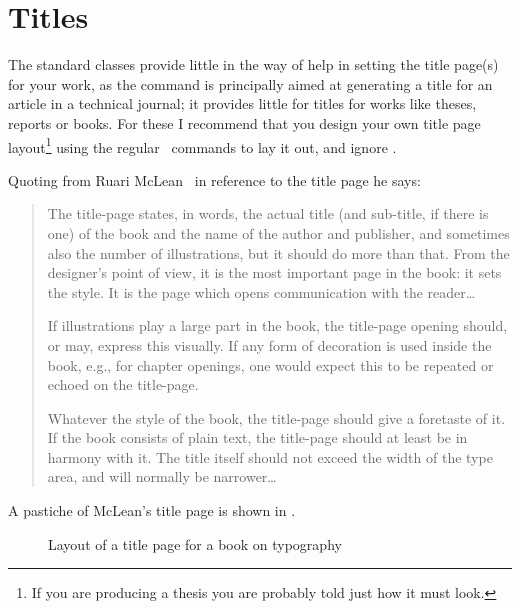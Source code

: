 \chapter{Titles}

   The standard classes provide little in the way of help in setting
the title page(s) for your work, as the \cmd{\maketitle} command
is principally aimed at generating a title for an article in a technical
journal; it provides little for titles for works like theses, reports or
books. For these I recommend that you design your own title page 
layout\footnote{If you are producing a thesis you are probably told 
just how it must look.}
using the regular \ltx\ commands to lay it out, and ignore \cmd{\maketitle}.

    Quoting from Ruari McLean~\cite[p. 148]{MCLEAN80} in reference to the 
title page he says:
\begin{quotation}
    The title-page states, in words, the actual title (and sub-title, if 
there is one) of the book and the name of the author and publisher, and
sometimes also the number of illustrations, but it should do more than that.
From the designer's point of view, it is the most important page in the
book: it sets the style. It is the page which opens communication with the
reader\ldots

    If illustrations play a large part in the book, the title-page opening 
should, or may, express this visually. If any form of decoration is used 
inside the book, e.g., for chapter openings, one would expect this to be
repeated or echoed on the title-page.

    Whatever the style of the book, the title-page should give a foretaste
of it. If the book consists of plain text, the title-page should at least 
be in harmony with it. The title itself should not exceed the width of the
type area, and will normally be narrower\ldots
\end{quotation}

    A pastiche of McLean's title page is shown in .

\begin{figure}
\centering
\begin{showtitle}
\titleTH
\end{showtitle}
\caption{Layout of a title page for a book on typography}\label{figure:titleTH}
\end{figure}


